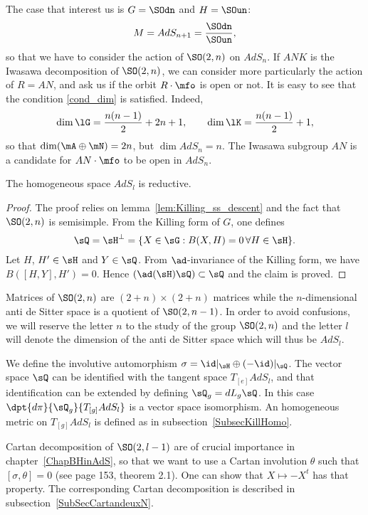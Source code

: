The case that interest us is $G=\SOdn$ and $H=\SOun$:
\[
	M=AdS_{n+1}=\dfrac{\SOdn}{\SOun},
\]
so that we have to consider the action of $\SO(2,n)$ on $AdS_n$.  If $ANK$ is the Iwasawa decomposition of $\SO(2,n)$, we can consider more particularly the action of $R=AN$, and ask us if the orbit $R\cdot\mfo$ is open or not. It is easy to see that the condition \eqref{cond_dim} is satisfied. Indeed,
\[
	\dim\lG=\frac{n(n-1)}{2}+2n+1,\qquad\dim\lK=\frac{n(n-1)}{2}+1,
\]
so that $\dim(\mA\oplus\mN)=2n$, but $\dim AdS_n=n$. The Iwasawa subgroup $AN$ is a candidate for $AN\cdot\mfo$ to be open in $AdS_n$.

\begin{proposition}
	The homogeneous space $AdS_l$ is reductive.
	\label{PropAdSreduct}
\end{proposition}

\begin{proof}
	The proof relies on lemma~\ref{lem:Killing_ss_descent} and the fact that $\SO(2,n)$ is semisimple. From the Killing form of $G$, one defines
	\[
		\sQ=\sH^{\perp}=\{X\in\sG:B(X,H)=0\,\forall H\in\sH\}.
	\]
	Let $H$, $H'\in\sH$ and $Y\in\sQ$. From $\ad$-invariance of the Killing form, we have $B([H,Y],H')=0$. Hence $(\ad(\sH)\sQ)\subset \sQ$ and the claim is proved.

\end{proof}

Matrices of $\SO(2,n)$ are $(2+n)\times(2+n)$ matrices while the $n$-dimensional anti de Sitter space is a quotient of $\SO(2,n-1)$. In order to avoid confusions, we will reserve the letter $n$ to the study of the group $\SO(2,n)$ and the letter $l$ will denote the dimension of the anti de Sitter space which will thus be $AdS_l$.

We define the involutive automorphism $\sigma=\id|_{\sH}\oplus(-\id)|_{\sQ}$.  The vector space $\sQ$ can be identified with the tangent space $T_{[e]}AdS_l$, and that identification can be extended by defining $\sQ_g=dL_g\sQ$. In this case $\dpt{d\pi}{\sQ_g}{T_{[g]}AdS_l}$ is a vector space isomorphism.\label{PgdpibaseQTgM} An homogeneous metric on $T_{[g]}AdS_l$ is defined as in subsection~\ref{SubsecKillHomo}.

Cartan decomposition of $\SO(2,l-1)$ are of crucial importance in chapter~\ref{ChapBHinAdS}, so that we want to use a Cartan involution $\theta$ such that $[\sigma,\theta]=0$ (see \cite{Loos} page 153, theorem 2.1). One can show that $X\mapsto -X^t$ has that property. The corresponding Cartan decomposition is described in subsection~\ref{SubSecCartandeuxN}.

